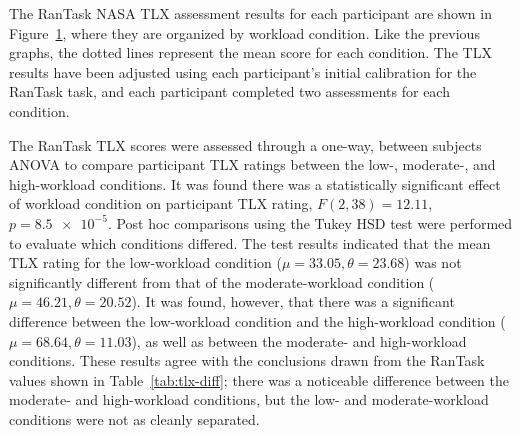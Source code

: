 \documentclass[11pt]{article}
\begin{document}
		The RanTask NASA TLX assessment results for each participant are shown in Figure~\ref{fig:rantask-tlx}, where they are organized by workload condition. Like the previous graphs, the dotted lines represent the mean score for each condition. The TLX results have been adjusted using each participant's initial calibration for the RanTask task, and each participant completed two assessments for each condition.
		
		\begin{figure}
		\centering
		\caption{}
		\label{fig:rantask-tlx}
		\end{figure} 
		
		The RanTask TLX scores were assessed through a one-way, between subjects ANOVA to compare participant TLX ratings between the low-, moderate-, and high-workload conditions. It was found there was a statistically significant effect of workload condition on participant TLX rating, \(F(2,38) = 12.11\), \(p = \num{8.5e-5}\). Post hoc comparisons using the Tukey HSD test were performed to evaluate which conditions differed. The test results indicated that the mean TLX rating for the low-workload condition (\(\mu = 33.05, \theta = 23.68 \)) was not significantly different from that of the moderate-workload condition (\(\mu = 46.21, \theta = 20.52\)). It was found, however, that there was a significant difference between the low-workload condition and the high-workload condition (\(\mu = 68.64, \theta = 11.03\)), as well as between the moderate- and high-workload conditions. These results agree with the conclusions drawn from the RanTask values shown in Table~\ref{tab:tlx-diff}; there was a noticeable difference between the moderate- and high-workload conditions, but the low- and moderate-workload conditions were not as cleanly separated.
		
\end{document}
